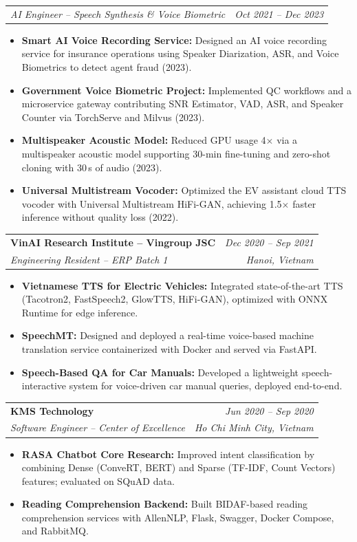 \documentclass[10pt,a4paper]{article}
\makeatletter
\newcommand{\cventry}[4]{%
  \noindent
  \begin{tabular*}{\linewidth}{@{}l@{\extracolsep{\fill}}r@{}}
    {\color{accent}\textbf{#1}} & \textit{\small #2} \\
    \textit{\small #3} & \textit{\small #4}
  \end{tabular*}%
  \vspace{1pt}%
}
\newcommand{\cvsubrole}[2]{%
  \noindent
  \begin{tabular*}{\linewidth}{@{}l@{\extracolsep{\fill}}r@{}}
    \textit{\small #1} & \textit{\small #2}
  \end{tabular*}%
  \vspace{1pt}%
}
\makeatother
\begin{document}
\vspace{2pt}
\cvsubrole{AI Engineer -- Speech Synthesis \& Voice Biometric}{Oct 2021 -- Dec 2023}
\begin{itemize}
  \item \textbf{Smart AI Voice Recording Service:} Designed an AI voice recording service for insurance operations using Speaker Diarization, ASR, and Voice Biometrics to detect agent fraud (2023).
  \item \textbf{Government Voice Biometric Project:} Implemented QC workflows and a microservice gateway contributing SNR Estimator, VAD, ASR, and Speaker Counter via TorchServe and Milvus (2023).
  \item \textbf{Multispeaker Acoustic Model:} Reduced GPU usage 4$\times$ via a multispeaker acoustic model supporting 30-min fine-tuning and zero-shot cloning with 30\,s of audio (2023).
  \item \textbf{Universal Multistream Vocoder:} Optimized the EV assistant cloud TTS vocoder with Universal Multistream HiFi-GAN, achieving 1.5$\times$ faster inference without quality loss (2022).
\end{itemize}

\vspace{3pt}

\cventry{VinAI Research Institute -- Vingroup JSC}{Dec 2020 -- Sep 2021}
        {Engineering Resident -- ERP Batch 1}{Hanoi, Vietnam}
\begin{itemize}
  \item \textbf{Vietnamese TTS for Electric Vehicles:} Integrated state-of-the-art TTS (Tacotron2, FastSpeech2, GlowTTS, HiFi-GAN), optimized with ONNX Runtime for edge inference.
  \item \textbf{SpeechMT:} Designed and deployed a real-time voice-based machine translation service containerized with Docker and served via FastAPI.
  \item \textbf{Speech-Based QA for Car Manuals:} Developed a lightweight speech-interactive system for voice-driven car manual queries, deployed end-to-end.
\end{itemize}

\vspace{3pt}

\cventry{KMS Technology}{Jun 2020 -- Sep 2020}
        {Software Engineer -- Center of Excellence}{Ho Chi Minh City, Vietnam}
\begin{itemize}
  \item \textbf{RASA Chatbot Core Research:} Improved intent classification by combining Dense (ConveRT, BERT) and Sparse (TF-IDF, Count Vectors) features; evaluated on SQuAD data.
  \item \textbf{Reading Comprehension Backend:} Built BIDAF-based reading comprehension services with AllenNLP, Flask, Swagger, Docker Compose, and RabbitMQ.
\end{itemize}
\end{document}
